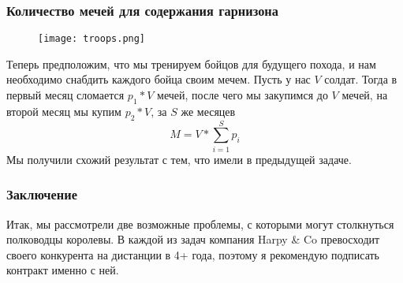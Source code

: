 \documentclass[8pt]{beamer}
\begin{document}
\begin{frame}
\frametitle{Количество мечей для содержания гарнизона}
\begin{figure}[h]
	\texttt{[image: troops.png]}
\end{figure}
	Теперь предположим, что мы тренируем бойцов для будущего похода, и нам необходимо снабдить каждого бойца своим мечем. 
	Пусть у нас $ V $ солдат. Тогда в первый месяц сломается $ p_{1} * V $ мечей, после чего мы закупимся до $ V $ мечей, на второй месяц мы купим $ p_{2} * V $, за $ S $ же месяцев $$ M = V * \sum\limits_{i=1}^S p_{i} $$
	Мы получили схожий результат с тем, что имели в предыдущей задаче.
\end{frame}

\begin{frame}
\frametitle{Заключение}
	Итак, мы рассмотрели две возможные проблемы, с которыми могут столкнуться полководцы королевы. В каждой из задач компания Harpy \& Co превосходит своего конкурента на дистанции в 4+ года, поэтому я рекомендую подписать контракт именно с ней. 
\end{frame}
\end{document}

